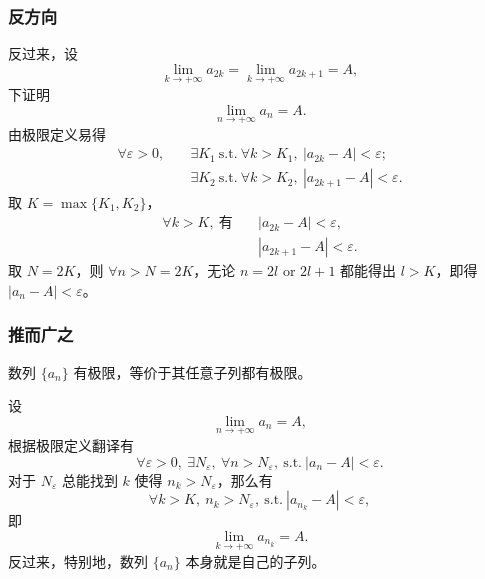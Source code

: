 \documentclass[UTF8,11pt]{ctexart}
\theoremstyle{cnthm}
\begin{document}
\subsubsection*{反方向}

反过来，设
\[
\lim_{k\to+\infty}a_{2k}=\lim_{k\to+\infty}a_{2k+1}=A,
\]
下证明
\[
\lim_{n\to+\infty}a_n=A .
\]
由极限定义易得
\[
\begin{aligned}
\forall\varepsilon>0,\quad
&\exists K_1\ \text{s.t.}\ \forall k>K_1,\ |a_{2k}-A|<\varepsilon;\\
&\exists K_2\ \text{s.t.}\ \forall k>K_2,\ |a_{2k+1}-A|<\varepsilon .
\end{aligned}
\]
取 $K=\max\{K_1,K_2\}$，
\[
\begin{aligned}
\forall k>K,\ \text{有}\quad
&|a_{2k}-A|<\varepsilon,\\
&|a_{2k+1}-A|<\varepsilon .
\end{aligned}
\]
取 $N=2K$，则 $\forall n>N=2K$，无论 $n=2l$ or $2l+1$
都能得出 $l>K$，即得 $|a_n-A|<\varepsilon$。

\subsubsection*{推而广之}

数列 $\{a_n\}$ 有极限，等价于其任意子列都有极限。

设
\[
\lim_{n\to+\infty}a_n=A,
\]
根据极限定义翻译有
\[
\forall\varepsilon>0,\ \exists N_\varepsilon,\ \forall n>N_\varepsilon,\
\text{s.t.}\ |a_n-A|<\varepsilon .
\]
对于 $N_\varepsilon$ 总能找到 $k$ 使得 $n_k>N_\varepsilon$，那么有
\[
\forall k>K,\ n_k>N_\varepsilon,\ \text{s.t.}\ |a_{n_k}-A|<\varepsilon,
\]
即
\[
\lim_{k\to+\infty}a_{n_k}=A .
\]
反过来，特别地，数列 $\{a_n\}$ 本身就是自己的子列。
\end{document}
